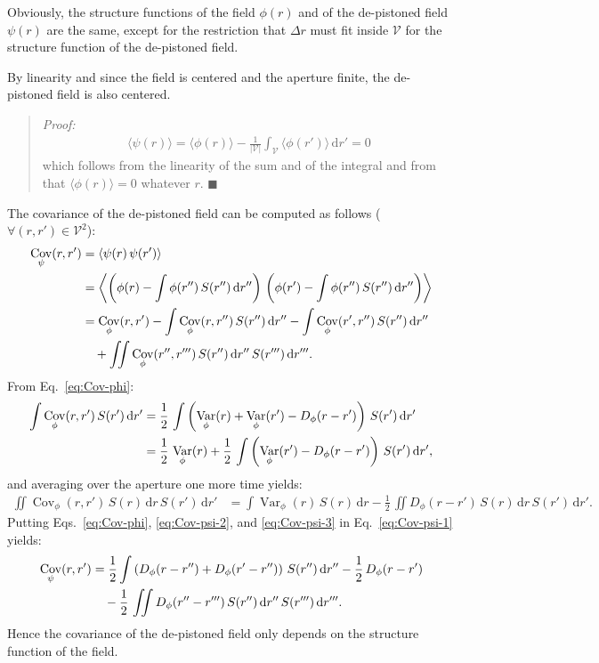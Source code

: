 \documentclass{article}
\DeclareMathOperator{\Var}{Var}
\DeclareMathOperator{\Cov}{Cov}
\begin{document}
Obviously, the structure functions of the field $\phi(r)$ and of the
de-pistoned field $\psi(r)$ are the same, except for the restriction that
$\Delta r$ must fit inside $\mathcal{V}$ for the structure function of the
de-pistoned field.

By linearity and since the field is centered and the aperture finite, the
de-pistoned field is also centered.
\begin{quote}
  \emph{Proof:}
  \begin{align}
    \langle\psi(r)\rangle
    = \langle\phi(r)\rangle -
      \frac{1}{|\mathcal{V}|} \int_{\mathcal{V}} \langle\phi(r')\rangle\,\mathrm{d}r'
    = 0
  \end{align}
  which follows from the linearity of the sum and of the integral and from that
  $\langle\phi(r)\rangle = 0$ whatever $r$. $\blacksquare$
\end{quote}

The covariance of the de-pistoned field can be computed as follows
($\forall (r,r') \in \mathcal{V}^{2}$):
\begin{align}
  \Cov_{\psi}(r,r')
  &= \langle\psi(r)\,\psi(r')\rangle \notag \\
  &= \left\langle\left(\phi(r) - \int \phi(r'')\,S(r'')\,\mathrm{d}r''\right)\,
    \left(\phi(r') - \int \phi(r'')\,S(r'')\,\mathrm{d}r''\right)\right\rangle \notag \\
  &= \Cov_{\phi}(r,r')
    - \int \Cov_{\phi}(r,r'')\,S(r'')\,\mathrm{d}r''
    - \int \Cov_{\phi}(r',r'')\,S(r'')\,\mathrm{d}r'' \notag\\
  &\quad + \iint \Cov_{\phi}(r'',r''')\,S(r'')\,\mathrm{d}r''\,S(r''')\,\mathrm{d}r'''.
    \label{eq:Cov-psi-1}
\end{align}
From Eq.~\eqref{eq:Cov-phi}:
\begin{align}
  \int \Cov_{\phi}(r,r')\,S(r')\,\mathrm{d}r'
  &= \frac{1}{2}\,\int \left(
    \Var_{\phi}(r) + \Var_{\phi}(r') - D_{\phi}(r - r')
    \right)\,S(r')\,\mathrm{d}r'\notag\\
  &= \frac{1}{2}\,\Var_{\phi}(r)
    + \frac{1}{2}\,\int \left(
    \Var_{\phi}(r') - D_{\phi}(r - r')\right)\,S(r')\,\mathrm{d}r',
    \label{eq:Cov-psi-2}
\end{align}
and averaging over the aperture one more time yields:
\begin{align}
  \iint \Cov_{\phi}(r,r')\,S(r)\,\mathrm{d}r\,S(r')\,\mathrm{d}r'
  &= \int \Var_{\phi}(r)\,S(r)\,\mathrm{d}r
  - \frac{1}{2}\,\iint D_{\phi}(r - r')\,S(r)\,\mathrm{d}r\,S(r')\,\mathrm{d}r'.
    \label{eq:Cov-psi-3}
\end{align}
Putting Eqs.~\eqref{eq:Cov-phi}, \eqref{eq:Cov-psi-2}, and \eqref{eq:Cov-psi-3}
in Eq.~\eqref{eq:Cov-psi-1} yields:
\begin{align}
  \Cov_{\psi}(r,r')
  &= \frac{1}{2} \int \left(D_{\phi}(r - r'') + D_{\phi}(r' - r'')\right)\,S(r'')\,\mathrm{d}r''
    - \frac{1}{2} \, D_{\phi}(r - r') \notag\\
  &\quad - \frac{1}{2}\,\iint D_{\phi}(r'' - r''')\,S(r'')\,\mathrm{d}r''\,S(r''')\,\mathrm{d}r'''.
    \label{eq:Cov-psi-4}
\end{align}
Hence the covariance of the de-pistoned field only depends on the structure
function of the field.
\end{document}

